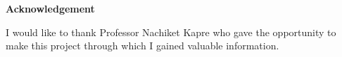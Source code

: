 \thispagestyle{plain}
\begin{center}
    \textbf{Acknowledgement}
\end{center}
 
I would like to thank Professor Nachiket Kapre who gave the opportunity to make this project through which I gained valuable information.